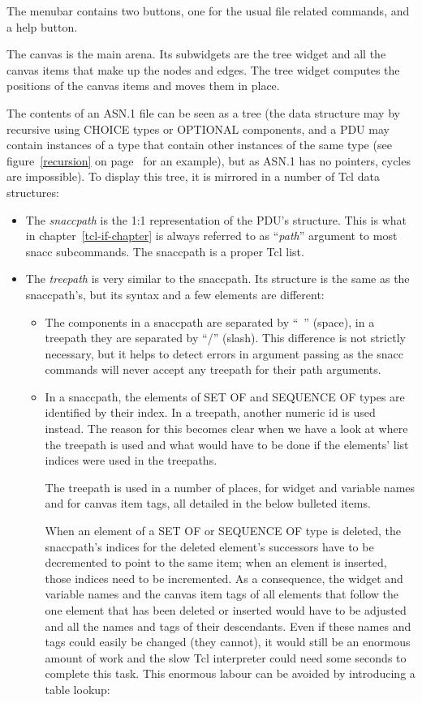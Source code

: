 The menubar contains two buttons, one for the usual file related commands, and a help button.

The canvas is the main arena.
Its subwidgets are the tree widget and all the canvas items that make up the nodes and edges.
The tree widget computes the positions of the canvas items and moves them in place.

The contents of an ASN.1 file can be seen as a tree (the data structure may by recursive using CHOICE types or OPTIONAL components, and a PDU may contain instances of a type that contain other instances of the same type (see figure~\ref{recursion} on page~\pageref{recursion} for an example), but as ASN.1 has no pointers, cycles are impossible).
To display this tree, it is mirrored in a number of Tcl data structures:
\begin{itemize}
  \item
    The \emph{snaccpath} is the 1:1 representation of the PDU's structure.
    This is what in chapter~\ref{tcl-if-chapter} is always referred to as ``\emph{path}'' argument to most {\Tcl snacc} subcommands.
    The snaccpath is a proper Tcl list.
  \item
    The \emph{treepath} is very similar to the snaccpath.
    Its structure is the same as the snaccpath's, but its syntax and a few elements are different:
    \begin{itemize}
      \item
	The components in a snaccpath are separated by ``~'' (space), in a treepath they are separated by ``/'' (slash).
	This difference is not strictly necessary, but it helps to detect errors in argument passing as the {\Tcl snacc} commands will never accept any treepath for their path arguments.
      \item
	In a snaccpath, the elements of SET OF and SEQUENCE OF types are identified by their index.
	In a treepath, another numeric id is used instead.
	The reason for this becomes clear when we have a look at where the treepath is used and what would have to be done if the elements' list indices were used in the treepaths.

	The treepath is used in a number of places, for widget and variable names and for canvas item tags, all detailed in the below bulleted items.

	When an element of a SET OF or SEQUENCE OF type is deleted, the snaccpath's indices for the deleted element's successors have to be decremented to point to the same item; when an element is inserted, those indices need to be incremented.
	As a consequence, the widget and variable names and the canvas item tags of all elements that follow the one element that has been deleted or inserted would have to be adjusted and all the names and tags of their descendants.
	Even if these names and tags could easily be changed (they cannot), it would still be an enormous amount of work and the slow Tcl interpreter could need some seconds to complete this task.
	This enormous labour can be avoided by introducing a table lookup:


\end{itemize}
\end{itemize}
